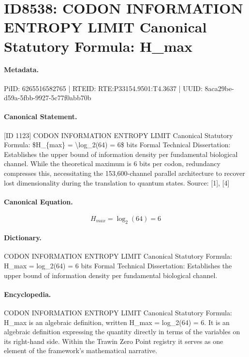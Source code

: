 \section*{ID8538: CODON INFORMATION ENTROPY LIMIT Canonical Statutory Formula: H\_max}
\paragraph{Metadata.}
PiID: 6265516582765 | RTEID: RTE:P33154.9501:T4.3637 | UUID: 8aca29be-d59a-5fbb-9927-5c77f0abb70b

\paragraph{Canonical Statement.}
[ID 1123] CODON INFORMATION ENTROPY LIMIT Canonical Statutory Formula: \$H\_\{max\} = \textbackslash{}log\_2(64) = 6\$ bits Formal Technical Dissertation: Establishes the upper bound of information density per fundamental biological channel. While the theoretical maximum is 6 bits per codon, redundancy compresses this, necessitating the 153,600-channel parallel architecture to recover lost dimensionality during the translation to quantum states. Source: [1], [4]

\paragraph{Canonical Equation.}
\[
H_{max} = \log_2(64) = 6
\]

\paragraph{Dictionary.}
CODON INFORMATION ENTROPY LIMIT Canonical Statutory Formula: H\_max = log\_2(64) = 6 bits Formal Technical Dissertation: Establishes the upper bound of information density per fundamental biological channel.

\paragraph{Encyclopedia.}
CODON INFORMATION ENTROPY LIMIT Canonical Statutory Formula: H\_max is an algebraic definition, written H\_max = log\_2(64) = 6. It is an algebraic definition expressing the quantity directly in terms of the variables on its right-hand side. Within the Trawin Zero Point registry it serves as one element of the framework's mathematical narrative.
